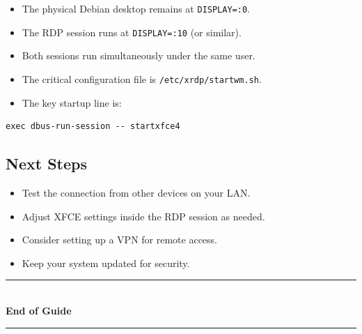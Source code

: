 \documentclass[a4paper,12pt]{article}
\newcommand{\code}[1]{\texttt{\small #1}}
\begin{document}
\begin{itemize}[leftmargin=2em]
    \item The physical Debian desktop remains at \code{DISPLAY=:0}.
    \item The RDP session runs at \code{DISPLAY=:10} (or similar).
    \item Both sessions run simultaneously under the same user.
    \item The critical configuration file is \code{/etc/xrdp/startwm.sh}.
    \item The key startup line is:
\end{itemize}

\begin{lstlisting}[style=shstyle]
exec dbus-run-session -- startxfce4
\end{lstlisting}

\subsection{Next Steps}

\begin{itemize}[leftmargin=2em]
    \item Test the connection from other devices on your LAN.
    \item Adjust XFCE settings inside the RDP session as needed.
    \item Consider setting up a VPN for remote access.
    \item Keep your system updated for security.
\end{itemize}

\vspace{1cm}

\begin{center}
    \rule{0.6\textwidth}{0.4pt}\\[0.3cm]
    {\large\bfseries End of Guide}\\[0.2cm]
    \rule{0.6\textwidth}{0.4pt}
\end{center}
\end{document}
